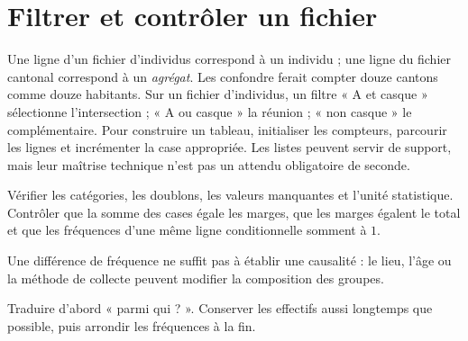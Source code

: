 \documentclass[../cours_2de.tex]{subfiles}
\begin{document}
\section{Filtrer et contrôler un fichier}
Une ligne d'un fichier d'individus correspond à un individu ; une ligne du fichier cantonal correspond à un \emph{agrégat}. Les confondre ferait compter douze cantons comme douze habitants.
Sur un fichier d'individus, un filtre « A et casque » sélectionne l'intersection ; « A ou casque » la réunion ; « non casque » le complémentaire.
Pour construire un tableau, initialiser les compteurs, parcourir les lignes et incrémenter la case appropriée. Les listes peuvent servir de support, mais leur maîtrise technique n'est pas un attendu obligatoire de seconde.
\begin{methode}[Contrôles]
Vérifier les catégories, les doublons, les valeurs manquantes et l'unité statistique.
Contrôler que la somme des cases égale les marges, que les marges égalent le total et que les fréquences d'une même ligne conditionnelle somment à $1$.
\end{methode}
Une différence de fréquence ne suffit pas à établir une causalité : le lieu, l'âge ou la méthode de collecte peuvent modifier la composition des groupes.
\begin{retenir}
Traduire d'abord « parmi qui ? ». Conserver les effectifs aussi longtemps que possible, puis arrondir les fréquences à la fin.
\end{retenir}
\end{document}
